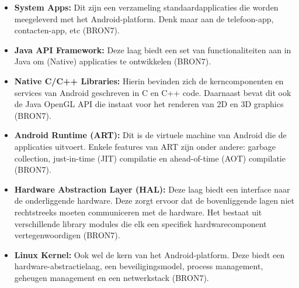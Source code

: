 \begin{itemize}
  \item \textbf{System Apps:} Dit zijn een verzameling standaardapplicaties die worden meegeleverd met het Android-platform. Denk maar aan de telefoon-app, contacten-app, etc (BRON7).

  \item \textbf{Java API Framework:} Deze laag biedt een set van functionaliteiten aan in Java om (Native) applicaties te ontwikkelen (BRON7).

  \item \textbf{Native C/C++ Libraries:} Hierin bevinden zich de kerncomponenten en services van Android geschreven in C en C++ code. Daarnaast bevat dit ook de Java OpenGL API die instaat voor het renderen van 2D en 3D graphics (BRON7).

  \item \textbf{Android Runtime (ART):} Dit is de virtuele machine van Android die de applicaties uitvoert. Enkele features van ART zijn onder andere: garbage collection, just-in-time (JIT) compilatie en ahead-of-time (AOT) compilatie (BRON7).

  \item \textbf{Hardware Abstraction Layer (HAL):} Deze laag biedt een interface naar de onderliggende hardware. Deze zorgt ervoor dat de bovenliggende lagen niet rechtstreeks moeten communiceren met de hardware. Het bestaat uit verschillende library modules die elk een specifiek hardwarecomponent vertegenwoordigen (BRON7).

  \item \textbf{Linux Kernel:} Ook wel de kern van het Android-platform. Deze biedt een hardware-abstractielaag, een beveiligingsmodel, process management, geheugen management en een netwerkstack (BRON7).
\end{itemize}




